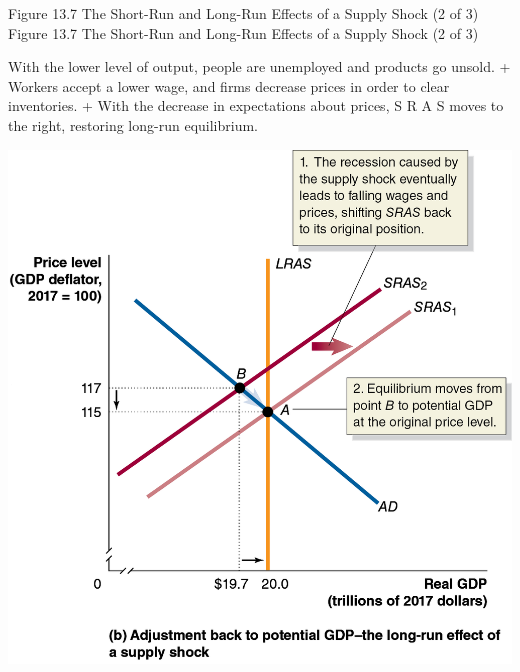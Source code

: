 \documentclass[
  12pt,
  ignorenonframetext,
]{beamer}
\begin{document}
\begin{frame}{Figure 13.7 The Short-Run and Long-Run Effects of a Supply
Shock (2 of 3)}
\protect\hypertarget{figure-13.7-the-short-run-and-long-run-effects-of-a-supply-shock-2-of-3}{}
Figure 13.7 The Short-Run and Long-Run Effects of a Supply Shock (2 of
3)

With the lower level of output, people are unemployed and products go
unsold. + Workers accept a lower wage, and firms decrease prices in
order to clear inventories. + With the decrease in expectations about
prices, S R A S moves to the right, restoring long-run equilibrium.

\includegraphics[width=\textwidth,height=0.99\textheight]{imgs3/img_slide38a.png}
\end{frame}
\end{document}
